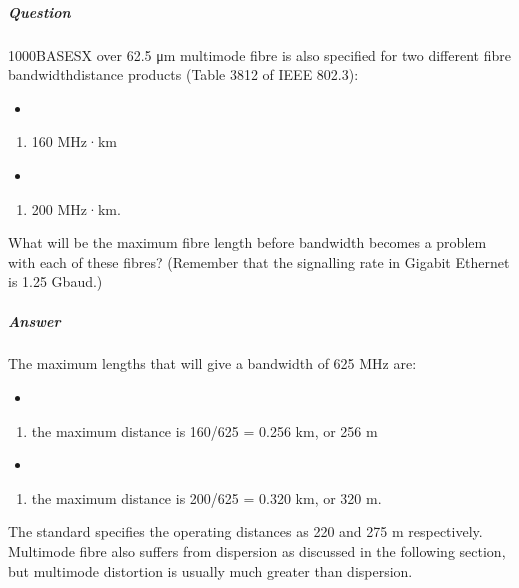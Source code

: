 \documentclass[letterpaper,10pt,english]{sphinxmanual}
\begin{document}
\subparagraph{Question}
\label{\detokenize{content/session_00/Part_00_02:id15}}
1000BASE\sphinxhyphen{}SX over 62.5 μm multimode fibre is also specified for two different fibre bandwidth\sphinxhyphen{}distance products (Table 38\sphinxhyphen{}12 of IEEE 802.3):
\begin{itemize}
\item {} 
\end{itemize}
\begin{enumerate}
%
\item {} 
160 MHz·km

\end{enumerate}
\begin{itemize}
\item {} 
\end{itemize}
\begin{enumerate}
%
\setcounter{enumi}{1}
\item {} 
200 MHz·km.

\end{enumerate}

What will be the maximum fibre length before bandwidth becomes a problem with each of these fibres? (Remember that the signalling rate in Gigabit Ethernet is 1.25 Gbaud.)


\subparagraph{Answer}
\label{\detokenize{content/session_00/Part_00_02:id16}}
The maximum lengths that will give a bandwidth of 625 MHz are:
\begin{itemize}
\item {} 
\end{itemize}
\begin{enumerate}
%
\item {} 
the maximum distance is 160/625 = 0.256 km, or 256 m

\end{enumerate}
\begin{itemize}
\item {} 
\end{itemize}
\begin{enumerate}
%
\setcounter{enumi}{1}
\item {} 
the maximum distance is 200/625 = 0.320 km, or 320 m.

\end{enumerate}

The standard specifies the operating distances as 220 and 275 m respectively. Multimode fibre also suffers from dispersion as discussed in the following section, but multimode distortion is usually much greater than dispersion.
\end{document}
